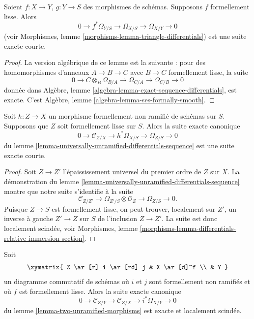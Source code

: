 \begin{lemma}
\label{lemma-triangle-differentials-formally-smooth}
Soient $f : X \to Y$, $g : Y \to S$ des morphismes de schémas.
Supposons $f$ formellement lisse. Alors
$$
0 \to f^*\Omega_{Y/S} \to \Omega_{X/S} \to \Omega_{X/Y} \to 0
$$
(voir
Morphismes, lemme \ref{morphisms-lemma-triangle-differentials})
est une suite exacte courte.
\end{lemma}

\begin{proof}
La version algébrique de ce lemme est la suivante :
pour des homomorphismes d'anneaux $A \to B \to C$ avec $B \to C$ formellement lisse,
la suite
$$
0 \to C \otimes_B \Omega_{B/A} \to \Omega_{C/A} \to \Omega_{C/B} \to 0
$$
donnée dans
Algèbre, lemme \ref{algebra-lemma-exact-sequence-differentials},
est exacte. C'est
Algèbre, lemme \ref{algebra-lemma-ses-formally-smooth}.
\end{proof}

\begin{lemma}
\label{lemma-differentials-formally-unramified-formally-smooth}
Soit $h : Z \to X$ un morphisme formellement non ramifié de schémas sur $S$.
Supposons que $Z$ soit formellement lisse sur $S$. Alors la
suite exacte canonique
$$
0 \to \mathcal{C}_{Z/X} \to h^*\Omega_{X/S} \to \Omega_{Z/S} \to 0
$$
du
lemme \ref{lemma-universally-unramified-differentials-sequence}
est une suite exacte courte.
\end{lemma}

\begin{proof}
Soit $Z \to Z'$ l'épaississement universel du premier ordre de $Z$ sur $X$.
La démonstration du
lemme \ref{lemma-universally-unramified-differentials-sequence}
montre que notre suite s'identifie à la suite
$$
\mathcal{C}_{Z/Z'} \to \Omega_{Z'/S} \otimes \mathcal{O}_Z \to
\Omega_{Z/S} \to 0.
$$
Puisque $Z \to S$ est formellement lisse, on peut trouver, localement sur $Z'$,
un inverse à gauche $Z' \to Z$ sur $S$ de l'inclusion $Z \to Z'$.
La suite est donc localement scindée, voir
Morphismes, lemme \ref{morphisms-lemma-differentials-relative-immersion-section}.
\end{proof}

\begin{lemma}
\label{lemma-two-unramified-morphisms-formally-smooth}
Soit
$$
\xymatrix{
Z \ar[r]_i \ar[rd]_j & X \ar[d]^f \\
& Y
}
$$
un diagramme commutatif de schémas où $i$ et $j$ sont formellement
non ramifiés et où $f$ est formellement lisse. Alors la suite exacte canonique
$$
0 \to
\mathcal{C}_{Z/Y} \to
\mathcal{C}_{Z/X} \to
i^*\Omega_{X/Y} \to 0
$$
du
lemme \ref{lemma-two-unramified-morphisms}
est exacte et localement scindée.
\end{lemma}

